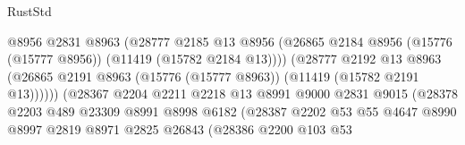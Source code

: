 \begin{lexlean}{RustStd}
\begin{coremodule}
                                          @8956
                                          @2831
                                          @8963
                                          (@28777
                                            @2185
                                            @13
                                            @8956
                                            (@26865
                                              @2184
                                              @8956
                                              (@15776 (@15777 @8956))
                                              (@11419 (@15782 @2184 @13))))
                                          (@28777
                                            @2192
                                            @13
                                            @8963
                                            (@26865
                                              @2191
                                              @8963
                                              (@15776 (@15777 @8963))
                                              (@11419 (@15782 @2191 @13))))))
                                      (@28367
                                        @2204
                                        @2211
                                        @2218
                                        @13
                                        @8991
                                        @9000
                                        @2831
                                        @9015
                                        (@28378
                                          @2203
                                          @489
                                          @23309
                                          @8991
                                          @8998
                                          @6182
                                          (@28387
                                            @2202
                                            @53
                                            @55
                                            @4647
                                            @8990
                                            @8997
                                            @2819
                                            @8971
                                            @2825
                                            @26843
                                            (@28386
                                              @2200
                                              @103
                                              @53

\end{coremodule}
\end{lexlean}
